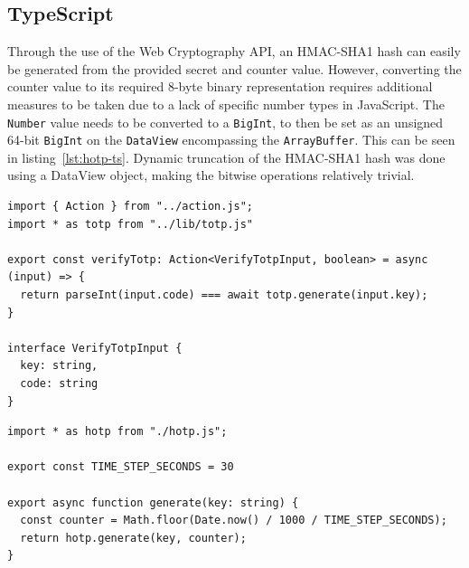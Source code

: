 \subsection{TypeScript}
Through the use of the Web Cryptography API, an HMAC-SHA1 hash can easily be generated from the provided secret and counter value. However, converting the counter value to its required 8-byte binary representation requires additional measures to be taken due to a lack of specific number types in JavaScript. The \texttt{Number} value needs to be converted to a \texttt{BigInt}, to then be set as an unsigned 64-bit \texttt{BigInt} on the \texttt{DataView} encompassing the \texttt{ArrayBuffer}. This can be seen in listing~\ref{lst:hotp-ts}. Dynamic truncation of the HMAC-SHA1 hash was done using a DataView object, making the bitwise operations relatively trivial.
\begin{listing}[H]
    \begin{verbatim}
import { Action } from "../action.js";
import * as totp from "../lib/totp.js"

export const verifyTotp: Action<VerifyTotpInput, boolean> = async (input) => {
  return parseInt(input.code) === await totp.generate(input.key);
}

interface VerifyTotpInput {
  key: string,
  code: string
}
    \end{verbatim}
    \caption{TOTP verification Action in TypeScript}
\end{listing}
\begin{listing}[H]
    \begin{verbatim}
import * as hotp from "./hotp.js";

export const TIME_STEP_SECONDS = 30

export async function generate(key: string) {
  const counter = Math.floor(Date.now() / 1000 / TIME_STEP_SECONDS);
  return hotp.generate(key, counter);
}
    \end{verbatim}
    \caption{TOTP generator in TypeScript}
\end{listing}
